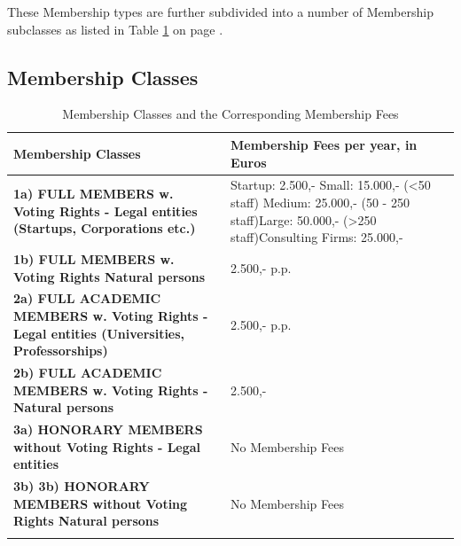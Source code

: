 \documentclass{article}
\begin{document}
These Membership types are further subdivided into a number of Membership subclasses as listed in Table \ref{table:Mem_Classes} on page \pageref{table:Mem_Classes}.

\subsection{Membership Classes}

\begin{longtable}{| p{} | p{} |}

	\hline
 	   \textbf{Membership Classes} & \textbf{Membership Fees per year, in Euros} \\ \hline\hline
 	   \textbf{1a) FULL MEMBERS w. Voting Rights - Legal entities (Startups, Corporations etc.)} &
	Startup: 2.500,- \newline Small: 15.000,- (\textless 50 staff) \newline Medium: 25.000,- (50 - 250 			staff)\newline Large: 50.000,- (\textgreater 250 staff)\newline Consulting Firms: 25.000,- \\
	\hline
		\textbf{1b) FULL MEMBERS w. Voting Rights Natural persons} & 2.500,- p.p. \\                                                                                                             	\hline
		\textbf{2a) FULL ACADEMIC MEMBERS w. Voting Rights - Legal entities (Universities, Professorships)} & 2.500,- p.p. \\                                                                                                             	\hline
		\textbf{2b) FULL ACADEMIC MEMBERS w. Voting Rights - Natural persons} & 2.500,- \\                                                                                                             	\hline
		\textbf{3a) HONORARY MEMBERS without Voting Rights - Legal entities} & No Membership Fees \\                                                                                                             	\hline
		\textbf{3b) 3b) HONORARY MEMBERS without Voting Rights Natural persons} & No Membership Fees \\                                                                                                             	\hline
	
	\caption{Membership Classes and the Corresponding Membership Fees}
	\label{table:Mem_Classes}

\end{longtable}
\end{document}
